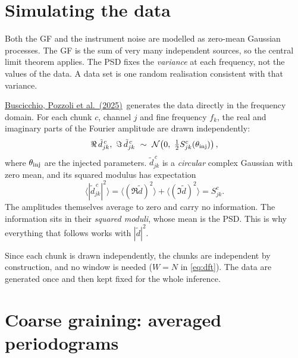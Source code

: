 \documentclass[11pt,a4paper]{article}
\newcommand{\urlPone}{https://arxiv.org/pdf/2511.03604}
\newcommand{\Pone}{\href{\urlPone}{Buscicchio, Pozzoli et al.~(2025)}}
\begin{document}
\section{Simulating the data}\label{sec:data}

Both the GF and the instrument noise are modelled as zero-mean Gaussian processes.
The GF is the sum of very many independent sources, so the central limit theorem
applies. The PSD fixes the \emph{variance} at each frequency, not the values of the
data. A data set is one random realisation consistent with that variance.

\Pone\ generates the data directly in the frequency domain. For each chunk $c$,
channel $j$ and fine frequency $f_k$, the real and imaginary parts of the Fourier
amplitude are drawn independently:
\begin{equation}
  \Re\,\tilde d^{\,c}_{jk},\ \Im\,\tilde d^{\,c}_{jk} \ \sim\ \mathcal{N}\!\left(0,\ \tfrac12 S^c_{jk}(\theta_{\rm inj})\right),
  \label{eq:draw}
\end{equation}
where $\theta_{\rm inj}$ are the injected parameters. $\tilde d^{\,c}_{jk}$ is a
\emph{circular} complex Gaussian with zero mean, and its squared modulus has
expectation
\begin{equation}
  \big\langle |\tilde d^{\,c}_{jk}|^2\big\rangle
  = \big\langle (\Re\tilde d)^2\big\rangle + \big\langle (\Im\tilde d)^2\big\rangle
  = S^c_{jk}.
\end{equation}
The amplitudes themselves average to zero and carry no information. The
information sits in their \emph{squared moduli}, whose mean is the PSD. This is
why everything that follows works with $|\tilde d|^2$.

Since each chunk is drawn independently, the chunks are independent by
construction, and no window is needed ($W=N$ in \cref{eq:dft}). The data are
generated once and then kept fixed for the whole inference.

\section{Coarse graining: averaged periodograms}\label{sec:coarse}
\end{document}
